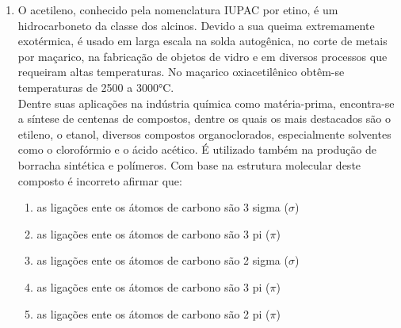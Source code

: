 \documentclass[10pt,a4paper]{article}
\begin{document}
\begin{multicols}{2}
\begin{enumerate}
	O representante mais conhecido e est\'avel da fam\'ilia dos fulerenos \'e o $C_{60}$: 60 \'atomos de carbono dispostos na forma de um \emph{icosaedro}. Em rela\c{c}\~ao aos tipos de hibridiza\c{c}\~oes de orbitais que os \'atomos de carbono presentes nesta mol\'ecula, podemos afirmar que:


		\begin{enumerate}
		\item a hibridiza\c{c}\~ao do tipo $sp^2$ resulta em 2 orbitais $sp^2$ e 2 orbitais p
		\item a hibridiza\c{c}\~ao do tipo $sp^3$ resulta em 2 orbitais $sp^3$ e 2 orbitais p
		\item a hibridiza\c{c}\~ao do tipo $sp^2$ resulta em 3 orbitais $sp^2$ e 1 orbital p
		\item a hibridiza\c{c}\~ao do tipo $sp^3$ resulta em 1 orbitais $sp^3$ e 3 orbitais p
		\item a hibridiza\c{c}\~ao do tipo $sp^3$ resulta em 2 orbitais $sp^3$ e 2 orbitais p
		\end{enumerate}
	\item O acetileno, conhecido pela nomenclatura IUPAC por etino, \'e um hidrocarboneto da classe dos alcinos. Devido a sua queima extremamente exot\'ermica, \'e usado em larga escala na solda autog\^enica, no corte de metais por ma\c{c}arico, na fabrica\c{c}\~ao de objetos de vidro e em diversos processos que requeiram altas temperaturas. No ma\c{c}arico oxiacetil\^enico obt\^em-se temperaturas de 2500 a 3000°C. \\
	Dentre suas aplica\c{c}\~oes na ind\'ustria qu\'imica como mat\'eria-prima, encontra-se a s\'intese de centenas de compostos, dentre os quais os mais destacados s\~ao o etileno, o etanol, diversos compostos organoclorados, especialmente solventes como o clorof\'ormio e o \'acido ac\'etico. \'E utilizado tamb\'em na produ\c{c}\~ao de borracha sint\'etica e pol\'imeros. Com base na estrutura molecular deste composto \'e incorreto afirmar que:

		\begin{enumerate}
		\item as liga\c{c}\~oes ente os \'atomos de carbono s\~ao 3 sigma ($\sigma$)
		\item as liga\c{c}\~oes ente os \'atomos de carbono s\~ao 3 pi ($\pi$)
		\item as liga\c{c}\~oes ente os \'atomos de carbono s\~ao 2 sigma ($\sigma$)
		\item as liga\c{c}\~oes ente os \'atomos de carbono s\~ao 3 pi ($\pi$)
		\item as liga\c{c}\~oes ente os \'atomos de carbono s\~ao 2 pi ($\pi$)
		\end{enumerate}


\end{enumerate}
\end{multicols}
\end{document}
